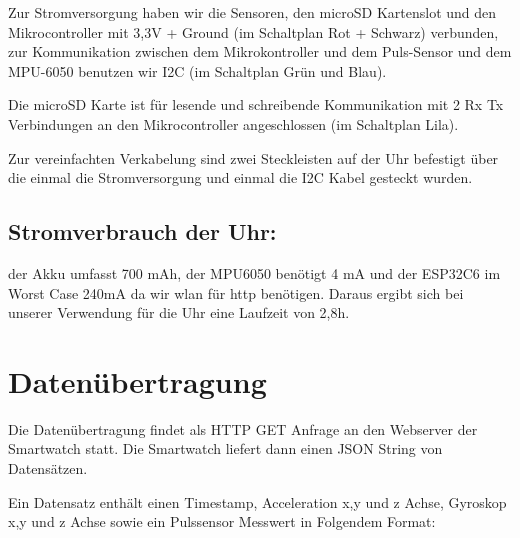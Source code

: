 \documentclass[a4paper, 11pt]{article}
\begin{document}
\noindent Zur Stromversorgung haben wir die Sensoren, den microSD Kartenslot und den Mikrocontroller mit 3,3V + Ground (im Schaltplan Rot + Schwarz) verbunden, zur Kommunikation zwischen dem Mikrokontroller und dem Puls-Sensor und dem MPU-6050 benutzen wir I2C (im Schaltplan Grün und Blau).

\noindent Die microSD Karte ist für lesende und schreibende Kommunikation mit 2 Rx Tx Verbindungen an den Mikrocontroller angeschlossen (im Schaltplan Lila).

\noindent Zur vereinfachten Verkabelung sind zwei Steckleisten auf der Uhr befestigt über die einmal die Stromversorgung und einmal die I2C Kabel gesteckt wurden.

\subsection{Stromverbrauch der Uhr:}
der Akku umfasst 700 mAh, der MPU6050 benötigt 4 mA  und der ESP32C6 im Worst Case 240mA da wir wlan für http benötigen.
Daraus ergibt sich bei unserer Verwendung für die Uhr eine Laufzeit von 2,8h.

\clearpage

\section{Datenübertragung}
Die Datenübertragung findet als HTTP GET Anfrage an den Webserver der Smartwatch statt. Die Smartwatch liefert dann einen JSON String von Datensätzen.

\noindent
Ein Datensatz enthält einen Timestamp, Acceleration x,y und z Achse, Gyroskop x,y und z Achse sowie ein Pulssensor Messwert in Folgendem Format:

\clearpage
\end{document}
